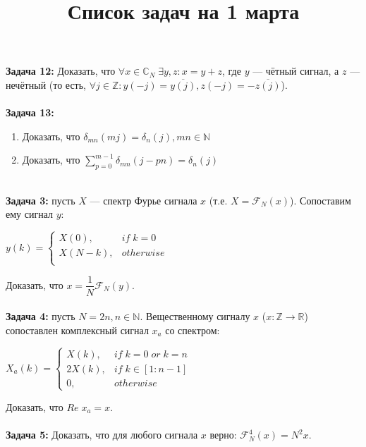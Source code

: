 \documentclass[38pt]{article}
\title{Список задач на 1 марта}
\author{}
\date{}
\begin{document}
\maketitle
\large{

\textbf{Задача 12:} Доказать, что $\forall x \in \mathbb{C}_{N} \; \exists y, z : x = y + z$, где $y$ --- чётный сигнал, а $z$ --- нечётный (то есть, $\forall j \in \mathbb{Z} : y(-j) = \overline{y(j)}, z(-j) = -\overline{z(j)}$). \\ \\

\textbf{Задача 13:}
	\begin{enumerate}
		\item {Доказать, что $\delta_{mn}(mj) = \delta_n(j), mn \in \mathbb{N}$}
		\item {Доказать, что $\sum\limits_{p = 0}^{m - 1} \delta_{mn}(j - pn) = \delta_n(j)$} \\ \\
	\end{enumerate}


\textbf{Задача 3:} пусть $X$ --- спектр Фурье сигнала $x$ (т.е. $X = \mathcal{F}_N(x)$). Сопоставим ему сигнал $y$:

$y(k) = \left\{\begin{matrix}
		X(0), & if\;k = 0 \\
		X(N - k), & otherwise \\
	\end{matrix}\right.$

Доказать, что $x = \dfrac{1}{N} \mathcal{F}_N(y)$. \\ \\


\textbf{Задача 4:} пусть $N = 2n, n \in \mathbb{N}$. Вещественному сигналу $x$ ($x: \mathbb{Z} \rightarrow \mathbb{R}$) сопоставлен комплексный сигнал $x_a$ со спектром:


	$X_a(k) = \left\{\begin{matrix}
			X(k), & if\;k = 0\;or\;k = n \\
			2X(k), & if\;k \in \left[1 : n - 1\right] \\
			0, & otherwise
		\end{matrix}\right.$

Доказать, что $Re\;x_a = x$. \\ \\


\textbf{Задача 5:} Доказать, что для любого сигнала $x$ верно: $\mathcal{F}_N^4(x) = N^2x$.

}
\end{document}
